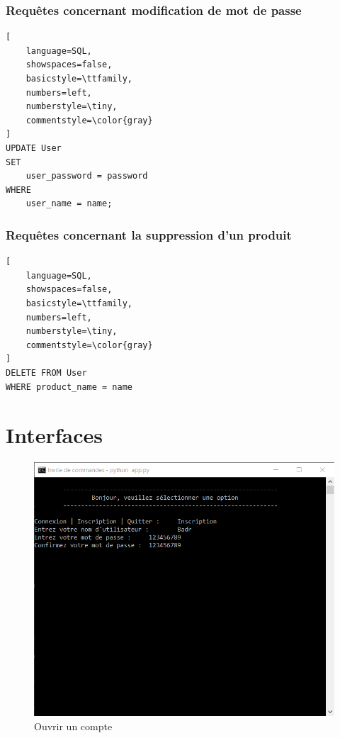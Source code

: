\subsubsection{Requêtes concernant modification de mot de passe}
\begin{lstlisting}[
    language=SQL,
    showspaces=false,
    basicstyle=\ttfamily,
    numbers=left,
    numberstyle=\tiny,
    commentstyle=\color{gray}
]
UPDATE User
SET
    user_password = password
WHERE
    user_name = name;
\end{lstlisting}

\subsubsection{Requêtes concernant la suppression d'un produit}
\begin{lstlisting}[
    language=SQL,
    showspaces=false,
    basicstyle=\ttfamily,
    numbers=left,
    numberstyle=\tiny,
    commentstyle=\color{gray}
]
DELETE FROM User
WHERE product_name = name
\end{lstlisting}

\section{Interfaces}

\begin{figure}[ht!]
    \centering
    \includegraphics[keepaspectratio=true,scale=0.7]{Figures/img1.png}
    \caption{Ouvrir un compte}
    \label{fig:img1}
\end{figure}

